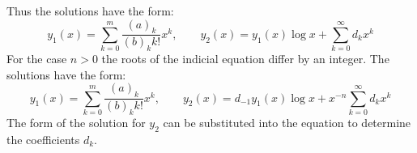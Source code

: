 {\begin{Solution}
\begin{enumerate}
    Thus the solutions have the form:
    \[
    \boxed{
      y_1(x) =  \sum_{k=0}^m \frac{ (a)_k }{ (b)_k k! } x^k, \qquad
      y_2(x) = y_1(x) \log x + \sum_{k=0}^\infty d_k x^k
      }
    \]
    For the case $n > 0$ the roots of the indicial equation differ by an
    integer.  The solutions have the form:
    \[
    \boxed{
      y_1(x) =  \sum_{k=0}^m \frac{ (a)_k }{ (b)_k k! } x^k, \qquad
      y_2(x) = d_{-1} y_1(x) \log x + x^{-n} \sum_{k=0}^\infty d_k x^k
      }
    \]
    The form of the solution for $y_2$ can be substituted into the equation 
    to determine the coefficients $d_k$.
  \end{enumerate}
\end{Solution}













}
